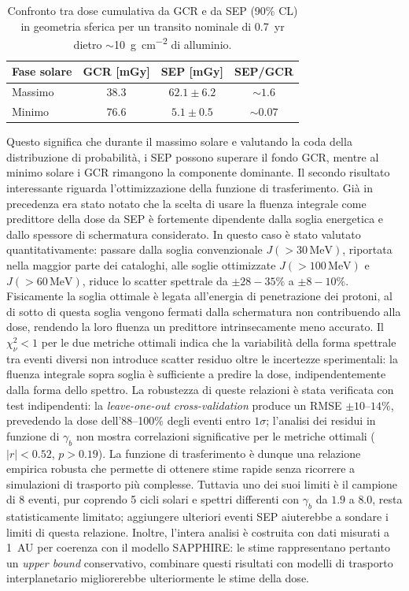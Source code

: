 \documentclass[a4paper,12pt]{article}
\begin{document}
\begin{table}[h]
\centering
\begin{tabular}{lccc}
\hline\hline
Fase solare & GCR [mGy] & SEP [mGy] & SEP/GCR \\
\hline
Massimo & $38.3$ & $62.1 \pm 6.2$ & $\sim 1.6$ \\
Minimo  & $76.6$ & $5.1 \pm 0.5$  & $\sim 0.07$ \\
\hline\hline
\end{tabular}
\caption{Confronto tra dose cumulativa da GCR e da SEP (90\% CL) in geometria sferica per un transito nominale di \SI{0.7}{yr} dietro $\sim$\SI{10}{\gram\per\centi\metre\squared} di alluminio.}
\label{tab:confronto_sep_gcr}
\end{table}
\noindent Questo significa che durante il massimo solare e valutando la coda della distribuzione di probabilità, i SEP possono superare il fondo GCR, mentre al minimo solare i GCR rimangono la componente dominante.
Il secondo risultato interessante riguarda l'ottimizzazione della funzione di trasferimento. Già in precedenza era stato notato \cite{kim2017} che la scelta di usare la fluenza integrale come predittore della dose da SEP è fortemente dipendente dalla soglia energetica e dallo spessore di schermatura considerato. 
In questo caso è stato valutato quantitativamente: passare dalla soglia convenzionale $J(>30\,\mathrm{MeV})$, riportata nella maggior parte dei cataloghi, alle soglie ottimizzate $J(>100\,\mathrm{MeV})$ e $J(>60\,\mathrm{MeV})$, riduce lo scatter spettrale da $\pm28-35\%$ a $\pm8-10\%$. 
Fisicamente la soglia ottimale è legata all'energia di penetrazione dei protoni, al di sotto di questa soglia vengono fermati dalla schermatura non contribuendo alla dose, rendendo la loro fluenza un predittore intrinsecamente meno accurato.
Il $\chi^2_\nu < 1$ per le due metriche ottimali indica che la variabilità della forma spettrale tra eventi diversi non introduce scatter residuo oltre le incertezze sperimentali: la fluenza integrale sopra soglia è sufficiente a predire la dose, indipendentemente dalla forma dello spettro. 
La robustezza di queste relazioni è stata verificata con test indipendenti: la \textit{leave-one-out cross-validation} produce un RMSE $\pm10$--$14\%$, prevedendo la dose dell'88--100\% degli eventi entro $1\sigma$; l'analisi dei residui in funzione di $\gamma_b$ non mostra correlazioni significative per le metriche ottimali ($|r| < 0.52$, $p > 0.19$).
La funzione di trasferimento è dunque una relazione empirica robusta che permette di ottenere stime rapide senza ricorrere a simulazioni di trasporto più complesse. Tuttavia uno dei suoi limiti è il campione di 8 eventi, pur coprendo 5 cicli solari e spettri differenti con $\gamma_b$ da $1.9$ a $8.0$, resta statisticamente limitato; aggiungere ulteriori eventi SEP aiuterebbe a sondare i limiti di questa relazione. Inoltre, l'intera analisi è costruita con dati misurati a \SI{1}{AU} per coerenza con il modello SAPPHIRE: le stime rappresentano pertanto un \textit{upper bound} conservativo, combinare questi risultati con modelli di trasporto interplanetario migliorerebbe ulteriormente le stime della dose. 
\end{document}
